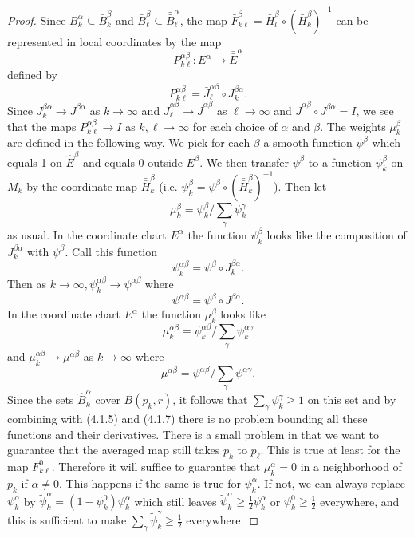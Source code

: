 \begin{proof}
Since $B^\alpha_k \subseteq \bar{B}^\beta_k$ and
$\bar{B}^\beta_\ell \subseteq \bar{\bar{B}}^{\alpha}_\ell$, the
map $\bar{F}^\beta_{k
\ell}=\bar{H}^{\beta}_l\circ(\bar{H}^{\beta}_k)^{-1}$ can be
represented in local coordinates by the map
$$
P^{\alpha \beta}_{k \ell}: E^\alpha \rightarrow
\bar{\bar{E}}^\alpha
$$
defined by
$$
P^{\alpha \beta}_{k \ell} = \bar{J}^{\alpha \beta}_\ell \circ
J^{\beta \alpha}_k.
$$
Since $J^{\beta \alpha}_k \rightarrow J^{\beta \alpha}$ as $k
\rightarrow \infty$ and $\bar{J}^{\alpha \beta}_\ell \rightarrow
\bar{J}^{\alpha \beta}$ as $\ell \rightarrow \infty$ and
$\bar{J}^{\alpha \beta} \circ J^{\beta \alpha} = I$, we see that
the maps $P^{\alpha \beta}_{k \ell} \rightarrow I$ as $k, \ell
\rightarrow \infty$ for each choice of $\alpha$ and $\beta$. The
weights $\mu^\beta_k$ are defined in the following way. We pick
for each $\beta$ a smooth function $\psi^\beta$ which equals 1 on
$\hat E^\beta$ and equals 0 outside $E^\beta$. We then transfer
$\psi^\beta$  to a function $\psi^\beta_k$ on $M_k$ by the
coordinate map $\bar{\bar{H}}^\beta_k$ (i.e. $\psi^\beta_k =
\psi^\beta\circ(\bar{\bar{H}}^\beta_k)^{-1}$). Then let
$$
\mu^\beta_k = \psi^\beta_k \Big/ \sum_\gamma \psi^\gamma_k
$$
as usual. In the coordinate chart $E^\alpha$ the function
$\psi^\beta_k$ looks like the composition of $J^{\beta \alpha}_k$
with $\psi^\beta$. Call this function
$$
\psi^{\alpha \beta}_k = \psi^\beta \circ J^{\beta \alpha}_k.
$$
Then as $k \rightarrow \infty, \psi^{\alpha \beta}_k \rightarrow
\psi^{\alpha \beta}$ where
$$
\psi^{\alpha \beta} = \psi^\beta \circ J^{\beta \alpha}.
$$
In the coordinate chart $E^\alpha$ the function $\mu^\beta_k$
looks like
$$
\mu_k^{\alpha \beta} = \psi_k^{\alpha \beta} \Big/ \sum_\gamma
\psi_k^{\alpha \gamma}
$$
and $\mu^{\alpha \beta}_k \rightarrow \mu^{\alpha \beta}$ as $k
\rightarrow \infty$ where
$$
\mu^{\alpha \beta} = \psi^{\alpha \beta} \Big/ \sum_\gamma
\psi^{\alpha \gamma}.
$$
Since the sets $\hat{B}^\alpha_k$ cover $B(p_k,r)$, it follows
that $\sum_\gamma \psi^\gamma_k \geq 1$ on this set and by
combining with (4.1.5) and (4.1.7) there is no problem bounding
all these functions and their derivatives. There is a small
problem in that we want to guarantee that the averaged map still
takes $p_k$ to $p_\ell$. This is true at least for the map $F^0_{k
\ell}$. Therefore it will suffice to guarantee that
$\mu^\alpha_k=0$ in a neighborhood of $p_k$ if $\alpha \neq 0$.
This happens if the same is true for $\psi^\alpha_k$. If not, we
can always replace $\psi^\alpha_k$ by $\tilde{\psi}^\alpha_k=(1-
\psi^0_k)\psi^\alpha_k$ which still leaves $\tilde{\psi}^\alpha_k
\geq \frac{1}{2} \psi^\alpha_k$ or $\psi^0_k \geq \frac{1}{2}$
everywhere, and this is sufficient to make $\sum_\gamma
\tilde{\psi}^\gamma_k \geq \frac{1}{2}$ everywhere.


\end{proof}
